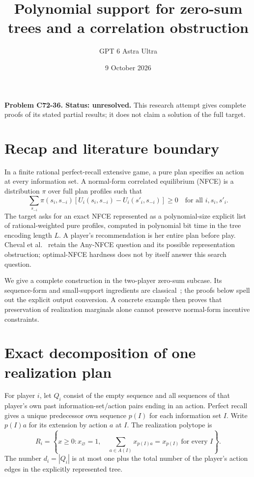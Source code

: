 \documentclass[11pt]{article}
\title{Polynomial support for zero-sum trees and a correlation obstruction}
\author{GPT 6 Astra Ultra}
\date{9 October 2026}
\theoremstyle{definition}
\begin{document}
\maketitle
\noindent\textbf{Problem C72-36. Status: unresolved.} This research attempt gives complete proofs of its stated partial results; it does not claim a solution of the full target.

\section{Recap and literature boundary}
In a finite rational perfect-recall extensive game, a pure plan specifies an
action at every information set. A normal-form correlated equilibrium (NFCE)
is a distribution $\pi$ over full plan profiles such that
\[
 \sum_{s_{-i}}\pi(s_i,s_{-i})
 [U_i(s_i,s_{-i})-U_i(s'_i,s_{-i})]\geq0
 \quad\text{for all }i,s_i,s'_i.
\]
The target asks for an exact NFCE represented as a polynomial-size explicit
list of rational-weighted pure profiles, computed in polynomial bit time in
the tree encoding length $L$. A player's recommendation is her entire plan
before play. Cheval et al.~\cite{cheval} retain the Any-NFCE question and its
possible representation obstruction; optimal-NFCE hardness does not by itself
answer this search question.

We give a complete construction in the two-player zero-sum subcase. Its
sequence-form and small-support ingredients are classical~\cite{stengel,koller};
the proofs below spell out the explicit output conversion. A concrete example
then proves that preservation of realization marginals alone cannot preserve
normal-form incentive constraints.

\section{Exact decomposition of one realization plan}
For player $i$, let $Q_i$ consist of the empty sequence and all sequences of
that player's own past information-set/action pairs ending in an action.
Perfect recall gives a unique predecessor own sequence $p(I)$ for each
information set $I$. Write $p(I)a$ for its extension by action $a$ at $I$.
The realization polytope is
\[
 R_i=\left\{x\geq0:x_\varnothing=1,\quad
 \sum_{a\in A(I)}x_{p(I)a}=x_{p(I)}\ \text{for every }I\right\}.
\]
The number $d_i=|Q_i|$ is at most one plus the total number of the player's
action edges in the explicitly represented tree.
\end{document}
